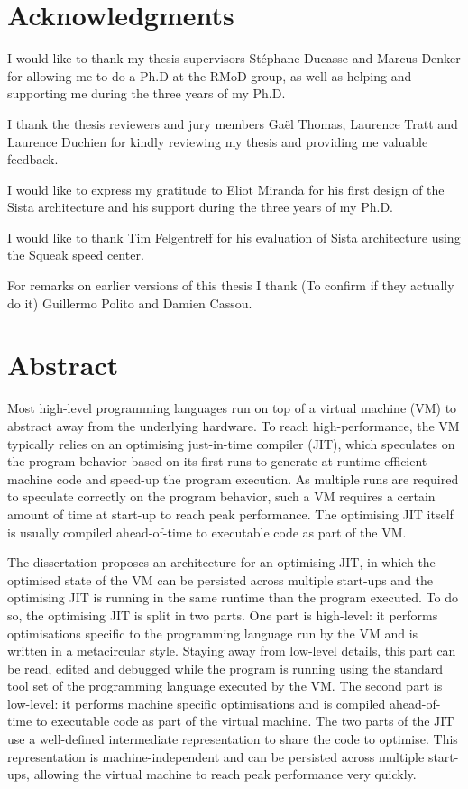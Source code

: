 \documentclass[a4paper,12pt,twoside]{includes/ThesisStyle}
\begin{document}

\dominitoc


\cleardoublepage

\section*{Acknowledgments}

I would like to thank my thesis supervisors St\'ephane Ducasse and Marcus Denker for allowing me to do a Ph.D at the RMoD group, as well as helping and supporting me during the three years of my Ph.D.

I thank the thesis reviewers and jury members Ga\"el Thomas, Laurence Tratt and Laurence Duchien for kindly reviewing my thesis and providing me valuable feedback.

I would like to express my gratitude to Eliot Miranda for his first design of the Sista architecture and his support during the three years of my Ph.D. 

I would like to thank Tim Felgentreff for his evaluation of Sista architecture using the Squeak speed center.

For remarks on earlier versions of this thesis I thank (To confirm if they actually do it) Guillermo Polito and Damien Cassou.

\cleardoublepage

\section*{Abstract}

Most high-level programming languages run on top of a virtual machine (VM) to abstract away from the underlying hardware. To reach high-performance, the VM typically relies on an optimising just-in-time compiler (JIT), which speculates on the program behavior based on its first runs to generate at runtime efficient machine code and speed-up the program execution. As multiple runs are required to speculate correctly on the program behavior, such a VM requires a certain amount of time at start-up to reach peak performance. The optimising JIT itself is usually compiled ahead-of-time to executable code as part of the VM.

The dissertation proposes an architecture for an optimising JIT, in which the optimised state of the VM can be persisted across multiple start-ups and the optimising JIT is running in the same runtime than the program executed. To do so, the optimising JIT is split in two parts. One part is high-level: it performs optimisations specific to the programming language run by the VM and is written in a metacircular style. Staying away from low-level details, this part can be read, edited and debugged while the program is running using the standard tool set of the programming language executed by the VM. The second part is low-level: it performs machine specific optimisations and is compiled ahead-of-time to executable code as part of the virtual machine. The two parts of the JIT use a well-defined intermediate representation to share the code to optimise. This representation is machine-independent and can be persisted across multiple start-ups, allowing the virtual machine to reach peak performance very quickly.
\end{document}
